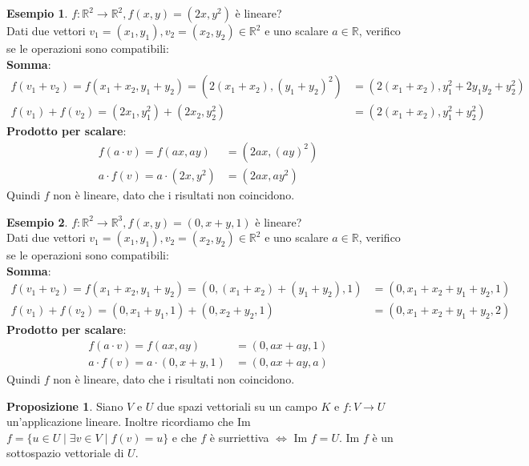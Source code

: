 \documentclass[a4paper]{article}
\theoremstyle{definition}
\newtheorem*{es}{Esempio}
\newtheorem*{prop}{Proposizione}
\begin{document}
\begin{es}
	$f: \mathbb{R}^2 \rightarrow \mathbb{R}^2, f(x, y) = (2x, y^2)$ è lineare? \\
	Dati due vettori $v_1 = (x_1, y_1), v_2 = (x_2, y_2) \in \mathbb{R}^2$ e uno scalare $a \in \mathbb{R}$, verifico se le operazioni sono compatibili: \\
	\textbf{Somma}:
	\begin{align*}
		f(v_1 + v_2) = f(x_1 + x_2, y_1 + y_2) = (2(x_1 + x_2), (y_1 + y_2)^2) & = (2(x_1 + x_2), y_1^2 + 2y_1y_2 + y_2^2) \\
		f(v_1) + f(v_2) = (2x_1, y_1^2) + (2x_2, y_2^2)                        & = (2(x_1 + x_2), y_1^2 + y_2^2)
	\end{align*}
	\textbf{Prodotto per scalare}:
	\begin{align*}
		f(a \cdot v) = f(ax, ay)         & = (2ax, (ay)^2) \\
		a \cdot f(v) = a \cdot (2x, y^2) & = (2ax, ay^2)
	\end{align*}
	Quindi $f$ non è lineare, dato che i risultati non coincidono.
\end{es}
\begin{es}
	$f: \mathbb{R}^2 \rightarrow \mathbb{R}^3, f(x, y) = (0, x+y, 1)$ è lineare? \\
	Dati due vettori $v_1 = (x_1, y_1), v_2 = (x_2, y_2) \in \mathbb{R}^2$ e uno scalare $a \in \mathbb{R}$, verifico se le operazioni sono compatibili: \\
	\textbf{Somma}:
	\begin{align*}
		f(v_1 + v_2) = f(x_1 + x_2, y_1 + y_2) = (0, (x_1 + x_2) + (y_1 + y_2), 1) & = (0, x_1 + x_2 + y_1 + y_2, 1) \\
		f(v_1) + f(v_2) = (0, x_1 + y_1, 1) + (0, x_2 + y_2, 1)                    & = (0, x_1 + x_2 + y_1 + y_2, 2)
	\end{align*}
	\textbf{Prodotto per scalare}:
	\begin{align*}
		f(a \cdot v) = f(ax, ay)             & = (0, ax + ay, 1) \\
		a \cdot f(v) = a \cdot (0, x + y, 1) & = (0, ax + ay, a)
	\end{align*}
	Quindi $f$ non è lineare, dato che i risultati non coincidono.
\end{es}
\begin{prop}
	Siano $V$ e $U$ due spazi vettoriali su un campo $K$ e $f: V \rightarrow U$ un'applicazione lineare.
	Inoltre ricordiamo che Im $f = \{u \in U \mid \exists v \in V \mid f(v) = u\}$ e che $f$ è surriettiva $\Leftrightarrow$ Im $f = U$.
	Im $f$ è un sottospazio vettoriale di $U$.
\end{prop}
\end{document}

